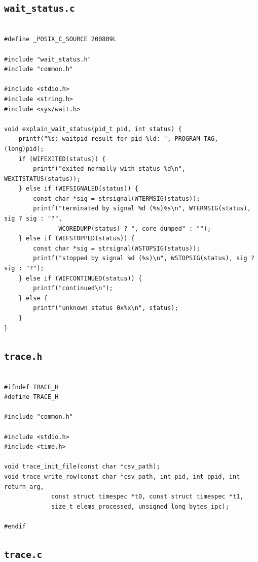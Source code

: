 \documentclass[11pt,a4paper]{article}
\begin{document}
\subsection{\texttt{wait_status.c}}

\lstset{style=textbookc}\begin{lstlisting}[caption={File \texttt{wait\_status.c}},label=lst:wait_status_c]

#define _POSIX_C_SOURCE 200809L

#include "wait_status.h"
#include "common.h"

#include <stdio.h>
#include <string.h>
#include <sys/wait.h>

void explain_wait_status(pid_t pid, int status) {
	printf("%s: waitpid result for pid %ld: ", PROGRAM_TAG, (long)pid);
	if (WIFEXITED(status)) {
		printf("exited normally with status %d\n", WEXITSTATUS(status));
	} else if (WIFSIGNALED(status)) {
		const char *sig = strsignal(WTERMSIG(status));
		printf("terminated by signal %d (%s)%s\n", WTERMSIG(status), sig ? sig : "?",
		       WCOREDUMP(status) ? ", core dumped" : "");
	} else if (WIFSTOPPED(status)) {
		const char *sig = strsignal(WSTOPSIG(status));
		printf("stopped by signal %d (%s)\n", WSTOPSIG(status), sig ? sig : "?");
	} else if (WIFCONTINUED(status)) {
		printf("continued\n");
	} else {
		printf("unknown status 0x%x\n", status);
	}
}

\end{lstlisting}\clearpage

\subsection{\texttt{trace.h}}

\lstset{style=textbookc}\begin{lstlisting}[caption={File \texttt{trace.h}},label=lst:trace_h]

#ifndef TRACE_H
#define TRACE_H

#include "common.h"

#include <stdio.h>
#include <time.h>

void trace_init_file(const char *csv_path);
void trace_write_row(const char *csv_path, int pid, int ppid, int return_arg,
		     const struct timespec *t0, const struct timespec *t1,
		     size_t elems_processed, unsigned long bytes_ipc);

#endif

\end{lstlisting}\clearpage

\subsection{\texttt{trace.c}}
\end{document}
